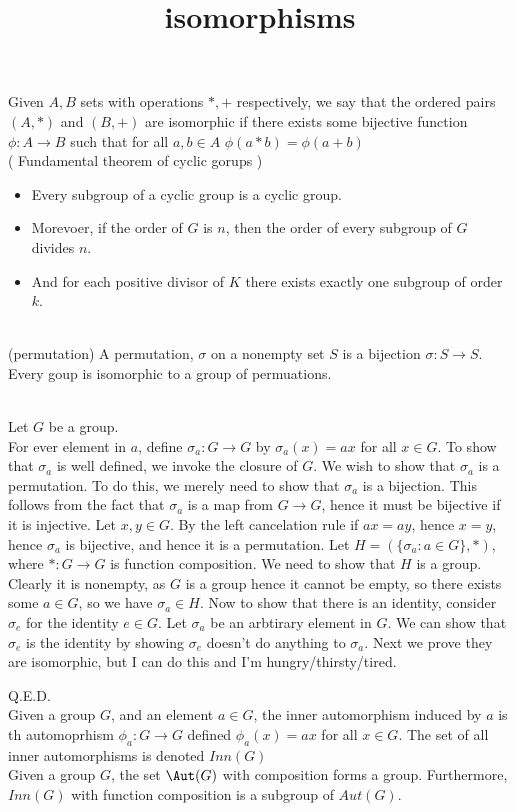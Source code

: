 \documentclass{article}
\title{isomorphisms}
\newcommand{\defn}{\fbox{definition}}
\begin{document}
\maketitle
Given $A,B$ sets with operations $*,+$ respectively, we say that the ordered pairs $(A,*)$ and $(B,+)$ are isomorphic if there exists some bijective function $\phi : A\rightarrow B$ such that for all $a,b\in A$ $\phi(a*b) = \phi(a+b)$\\

 ( Fundamental theorem of cyclic gorups ) \\
\begin{itemize}
    \item Every subgroup of a cyclic group is a cyclic group.
    \item Morevoer, if the order of $G$ is $n$, then the order of every subgroup of $G$ divides $n$. 
    \item And for each positive divisor of $K$ there exists exactly one subgroup of order $k$.
\end{itemize}\\

\defn (permutation) A permutation, $\sigma$ on a nonempty set $S$ is a bijection $\sigma: S\rightarrow S$. \\

 Every goup is isomorphic to a group of permuations.

\\
 Let $G$ be a group. \\

For ever element in $a$, define $\sigma_a :G\rightarrow G$ by $\sigma_a(x) = ax$ for all $x\in G$. To show that $\sigma_a$ is well defined, we invoke the closure of $G$. We wish to show that $\sigma_a$ is a permutation. To do this, we merely need to show that $\sigma_a$ is a bijection. This follows from the fact that $\sigma_a$ is a map from $G\rightarrow G$, hence it must be bijective if it is injective. Let $x,y\in G$. By the left cancelation rule if $ax = ay$, hence $x = y$, hence $\sigma_a$ is bijective, and hence it is a permutation. Let $H = (\{\sigma_a : a\in G\}, *)$, where $*:G\rightarrow G$ is function composition. We need to show that $H$ is a group. Clearly it is nonempty, as $G$ is a group hence it cannot be empty, so there exists some $a\in G$, so we have $\sigma_a\in H$. Now to show that there is an identity, consider $\sigma_e$ for the identity $e\in G$. Let $\sigma_a$ be an arbtirary element in $G$. We can show that $\sigma_e$ is the identity by showing $\sigma_e$ doesn't do anything to $\sigma_a$. Next we prove they are isomorphic, but I can do this and I'm hungry/thirsty/tired.

Q.E.D.\\

 Given a group $G$, and an element $a\in G$, the inner automorphism induced by $a$ is th automoprhism $\phi_a:G\rightarrow G$ defined $\phi_a(x) = ax$ for all $x\in G$. The set of all inner automorphisms is denoted $Inn(G)$\\

 Given a group $G$, the set $\Aut(G)$ with composition forms a group. Furthermore, $Inn(G)$ with function composition is a subgroup of $Aut(G).$
\end{document}
